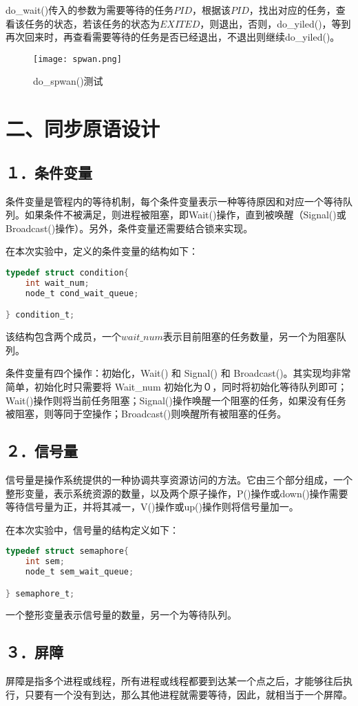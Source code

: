 \documentclass[UTF8,noindent]{ctexart}
\begin{document}
do\_wait()传入的参数为需要等待的任务$PID$，根据该$PID$，找出对应的任务，查看该任务的状态，若该任务的状态为$EXITED$，则退出，否则，do\_yiled()，等到再次回来时，再查看需要等待的任务是否已经退出，不退出则继续do\_yiled()。

\begin{figure}[H]
  \centering
  \texttt{[image: spwan.png]}
  \caption{do\_spwan()测试}
\end{figure}

\section*{二、同步原语设计}
\subsection*{１．条件变量}
条件变量是管程内的等待机制，每个条件变量表示一种等待原因和对应一个等待队列。如果条件不被满足，则进程被阻塞，即Wait()操作，直到被唤醒（Signal()或Broadcast()操作）。另外，条件变量还需要结合锁来实现。

在本次实验中，定义的条件变量的结构如下：
\begin{lstlisting}[language=c]
typedef struct condition{
	int wait_num;
	node_t cond_wait_queue;

} condition_t;
\end{lstlisting}
该结构包含两个成员，一个$wait\_num$表示目前阻塞的任务数量，另一个为阻塞队列。

条件变量有四个操作：初始化，Wait() 和 Signal() 和 Broadcast()。其实现均非常简单，初始化时只需要将 Wait\_num 初始化为０，同时将初始化等待队列即可；Wait()操作则将当前任务阻塞；Signal()操作唤醒一个阻塞的任务，如果没有任务被阻塞，则等同于空操作；Broadcast()则唤醒所有被阻塞的任务。
\subsection*{２．信号量}
信号量是操作系统提供的一种协调共享资源访问的方法。它由三个部分组成，一个整形变量，表示系统资源的数量，以及两个原子操作，P()操作或down()操作需要等待信号量为正，并将其减一，V()操作或up()操作则将信号量加一。

在本次实验中，信号量的结构定义如下：
\begin{lstlisting}[language=c]
typedef struct semaphore{
	int sem;
	node_t sem_wait_queue;

} semaphore_t;
\end{lstlisting}
一个整形变量表示信号量的数量，另一个为等待队列。

\subsection*{３．屏障}
屏障是指多个进程或线程，所有进程或线程都要到达某一个点之后，才能够往后执行，只要有一个没有到达，那么其他进程就需要等待，因此，就相当于一个屏障。
\end{document}
